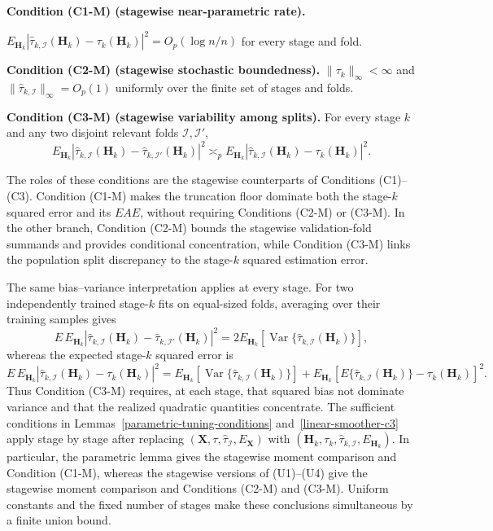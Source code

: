 \documentclass[11pt]{article}
\theoremstyle{referenceplain}
\theoremstyle{referencedefinition}
\theoremstyle{referenceremark}
\begin{document}
\medskip\noindent\textbf{Condition (C1-M) (stagewise near-parametric rate).}\par
\noindent$E_{\mathbf H_k}|\widehat\tau_{k,\mathcal I}(\mathbf H_k)-\tau_k(\mathbf H_k)|^2=O_p(\log n/n)$ for every stage and fold.

\medskip\noindent\textbf{Condition (C2-M) (stagewise stochastic boundedness).}
$\|\tau_k\|_\infty<\infty$ and $\|\widehat\tau_{k,\mathcal I}\|_\infty=O_p(1)$ uniformly over the finite set of stages and folds.

\medskip\noindent\textbf{Condition (C3-M) (stagewise variability among splits).}
For every stage $k$ and any two disjoint relevant folds $\mathcal I,\mathcal I'$,
\[
E_{\mathbf H_k}|\widehat\tau_{k,\mathcal I}(\mathbf H_k)-\widehat\tau_{k,\mathcal I'}(\mathbf H_k)|^2
\asymp_pE_{\mathbf H_k}|\widehat\tau_{k,\mathcal I}(\mathbf H_k)-\tau_k(\mathbf H_k)|^2.
\]

The roles of these conditions are the stagewise counterparts of Conditions (C1)--(C3). Condition (C1-M) makes the truncation floor dominate both the stage-$k$ squared error and its $EAE$, without requiring Conditions (C2-M) or (C3-M). In the other branch, Condition (C2-M) bounds the stagewise validation-fold summands and provides conditional concentration, while Condition (C3-M) links the population split discrepancy to the stage-$k$ squared estimation error.

The same bias--variance interpretation applies at every stage. For two independently trained stage-$k$ fits on equal-sized folds, averaging over their training samples gives
\[
E\,E_{\mathbf H_k}|\widehat\tau_{k,\mathcal I}(\mathbf H_k)-\widehat\tau_{k,\mathcal I'}(\mathbf H_k)|^2
=2E_{\mathbf H_k}\!\left[\operatorname{Var}\{\widehat\tau_{k,\mathcal I}(\mathbf H_k)\}\right],
\]
whereas the expected stage-$k$ squared error is
\[
E\,E_{\mathbf H_k}|\widehat\tau_{k,\mathcal I}(\mathbf H_k)-\tau_k(\mathbf H_k)|^2
=E_{\mathbf H_k}\!\left[\operatorname{Var}\{\widehat\tau_{k,\mathcal I}(\mathbf H_k)\}\right]
+E_{\mathbf H_k}\!\left[E\{\widehat\tau_{k,\mathcal I}(\mathbf H_k)\}-\tau_k(\mathbf H_k)\right]^2.
\]
Thus Condition (C3-M) requires, at each stage, that squared bias not dominate variance and that the realized quadratic quantities concentrate. The sufficient conditions in Lemmas~\ref{parametric-tuning-conditions} and~\ref{linear-smoother-c3} apply stage by stage after replacing $(\mathbf X,\tau,\widehat\tau_{\mathcal I},E_{\mathbf X})$ with $(\mathbf H_k,\tau_k,\widehat\tau_{k,\mathcal I},E_{\mathbf H_k})$. In particular, the parametric lemma gives the stagewise moment comparison and Condition (C1-M), whereas the stagewise versions of (U1)--(U4) give the stagewise moment comparison and Conditions (C2-M) and (C3-M). Uniform constants and the fixed number of stages make these conclusions simultaneous by a finite union bound.
\end{document}
